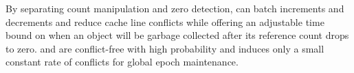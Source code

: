 By separating count manipulation and zero detection,  can
batch increments and decrements and
reduce cache line conflicts while offering an adjustable time bound
on when an object will be garbage collected after its reference count
drops to zero.   and  are conflict-free with high
probability and  induces only a small constant rate of
conflicts for global epoch maintenance.

%

